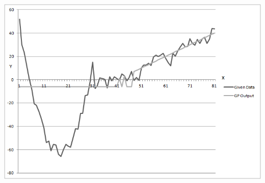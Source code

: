 \documentclass[11pt]{article} %
\begin{document}
\begin{center}
\includegraphics[scale = 0.8]{Graph3}
\end{center}
\pagebreak
\end{document}
